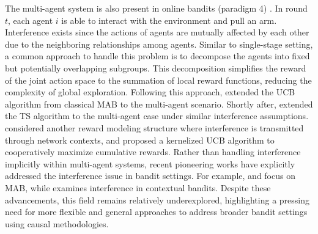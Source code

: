 The multi-agent system is also present in online bandits (paradigm 4) \citep{bargiacchi2018learning, verstraeten2020multi, dubey2020kernel}. In round $t$, each agent $i$ is able to interact with the environment and pull an arm. Interference exists since the actions of agents are mutually affected by each other due to the neighboring relationships among agents. Similar to single-stage setting, a common approach to handle this problem is to decompose the agents into fixed but potentially overlapping subgroups. This decomposition simplifies the reward of the joint action space to the summation of local reward functions, reducing the complexity of global exploration. Following this approach, \citet{bargiacchi2018learning} extended the \acrshort{UCB} algorithm from classical \acrshort{MAB} to the multi-agent scenario. Shortly after, \citet{verstraeten2020multi} extended the \acrshort{TS} algorithm to the multi-agent case under similar interference assumptions. \citet{dubey2020kernel} considered another reward modeling structure where interference is transmitted through network contexts, and proposed a kernelized \acrshort{UCB} algorithm to cooperatively maximize cumulative rewards. Rather than handling interference implicitly within multi-agent systems, recent pioneering works have explicitly addressed the interference issue in bandit settings. For example, \citet{jia2024multi} and \citet{agarwal2024multi} focus on \acrshort{MAB}, while \citet{xu2024linear} examines interference in contextual bandits.
Despite these advancements, this field remains relatively underexplored, highlighting a pressing need for more flexible and general approaches to address broader bandit settings using causal methodologies.


